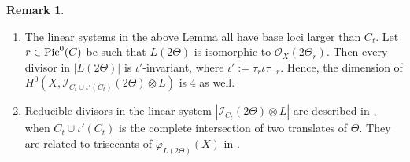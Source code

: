\documentclass[12pt]{amsart}
\numberwithin{equation}{subsection}
\theoremstyle{plain}
\theoremstyle{definition}
\newtheorem{rem}[thm]{Remark}
\newcommand{\StructureSheaf}[1]{{\mathcal O}_{#1}}
\newcommand{\Pic}{{\rm Pic}}
\newcommand{\Ideal}[1]{{\mathcal I}_{#1}}
\begin{document}
\begin{rem}
\begin{enumerate}
\item
The linear systems in the above Lemma all have base loci larger than $C_t$. 
Let $r\in\Pic^0(C)$ be such that $L(2\Theta)$ is isomorphic to $\StructureSheaf{X}(2\Theta_r)$. Then every divisor in 
$|L(2\Theta)|$ is $\iota'$-invariant, where $\iota':=\tau_r\iota\tau_{-r}$. Hence, the dimension of
$H^0(X,\Ideal{C_t\cup \iota'(C_t)}(2\Theta)\otimes L)$ is $4$ as well. 
\item
Reducible divisors in the linear system $|\Ideal{C_t}(2\Theta)\otimes L|$ are described in \cite[Prop. 11.9.1(a)]{BL}, when $C_t\cup \iota'(C_t)$ is the complete intersection of two translates of $\Theta$. They are related to trisecants of $\varphi_{L(2\Theta)}(X)$ in \cite[Prop. 11.9.3]{BL}.
\end{enumerate}
\end{rem}
\end{document}
